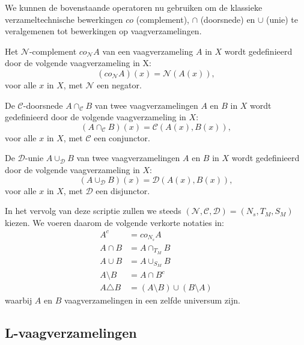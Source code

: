 We kunnen de bovenstaande operatoren nu gebruiken om de klassieke verzameltechnische bewerkingen 
$co$ (complement), $\cap$ (doorsnede) en $\cup$ (unie) te
veralgemenen tot bewerkingen op vaagverzamelingen.
\begin{definitie}
Het $\mathcal{N}$-complement $co_\mathcal{N} A$ van een vaagverzameling $A$ in $X$ wordt gedefinieerd
door de volgende vaagverzameling in X:
\begin{displaymath}
(co_\mathcal{N} A)(x) = \mathcal{N}(A(x)),
\end{displaymath}
voor alle $x$ in $X$, met $\mathcal{N}$ een negator.
\end{definitie}
\begin{definitie}
De $\mathcal{C}$-doorsnede $A \cap_\mathcal{C} B$ van twee vaagverzamelingen $A$ en $B$ in $X$
wordt gedefinieerd door de volgende vaagverzameling in $X$:
\begin{displaymath}
(A \cap_\mathcal{C} B)(x) = \mathcal{C}(A(x),B(x)),
\end{displaymath}
voor alle $x$ in $X$, met $\mathcal{C}$ een conjunctor.
\end{definitie}
\begin{definitie}
De $\mathcal{D}$-unie $A \cup_\mathcal{D} B$ van twee vaagverzamelingen $A$ en $B$ in $X$ wordt gedefinieerd door de
volgende vaagverzameling in $X$:
\begin{displaymath}
(A \cup_\mathcal{D} B)(x) = \mathcal{D}(A(x),B(x)),
\end{displaymath}
voor alle $x$ in $X$, met $\mathcal{D}$ een disjunctor.
\end{definitie}

In het vervolg van deze scriptie zullen we steeds 
$(\mathcal{N},\mathcal{C},\mathcal{D})=(N_s,T_M,S_M)$ kiezen. We voeren daarom de volgende
verkorte notaties in:
\begin{align*}
A^c 			&= co_{N_s} A \\
A \cap B 		&= A \cap_{T_M} B \\
A \cup B		&= A \cup_{S_M} B \\
A \setminus B  	&= A \cap B^c \\
A \triangle B 	&= (A \setminus B) \cup (B \setminus A)
\end{align*}
waarbij $A$ en $B$ vaagverzamelingen in een zelfde universum zijn.


\subsection{L-vaagverzamelingen}


